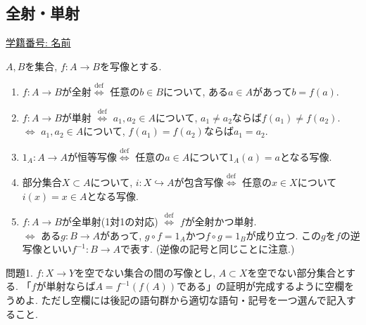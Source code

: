 \documentclass[dvipdfmx,a4paper,11pt]{article}
\theoremstyle{definition}
\begin{document}

 \newpage
 \begin{center}
\section{全射・単射}
\label{sec-4}
\end{center}
 \begin{flushleft}
{ \large \underline{学籍番号: \hspace{4cm} 名前  \hspace{8.5cm}}}
{\footnotesize }
\end{flushleft}


\begin{tcolorbox}[
    colback = white,
    colframe = black!35!black,
    fonttitle = \bfseries,
    breakable = true]
    $A,B$を集合, $f :A \to B$を写像とする. 
    \begin{enumerate}
    \setlength{\parskip}{0cm} 
  \setlength{\itemsep}{0cm} 
    \item $f :A \to B$が全射$\stackrel{\mathrm{def}}{\Longleftrightarrow}$ 任意の$b \in B$について, ある$a \in A$があって$b = f(a)$.
    \item $f :A \to B$が単射 $\stackrel{\mathrm{def}}{\Longleftrightarrow}$ $a_1, a_2 \in A$について, $a_1 \neq a_2$ならば$f(a_1) \neq f(a_2)$.
    \\ $\stackrel{}{\Longleftrightarrow}$ $a_1, a_2 \in A$について, $f(a_1)=f(a_2)$ならば$a_1 = a_2$.
    \item $1_{A}: A \to A$が恒等写像$\stackrel{\mathrm{def}}{\Longleftrightarrow}$ 任意の$a \in A$について$1_A(a)=a$となる写像. 
    \item 部分集合$X \subset A$について, $i : X\hookrightarrow A$が包含写像$\stackrel{\mathrm{def}}{\Longleftrightarrow}$ 任意の$x \in X$について$i(x)=x \in A$となる写像. 
    \item $f :A \to B$が全単射(1対1の対応) $\stackrel{\mathrm{def}}{\Longleftrightarrow}$ $f$が全射かつ単射.
    \\ $\stackrel{}{\Longleftrightarrow}$ ある$g : B\to A$があって, $g \circ f = 1_A$かつ$f \circ g = 1_B$が成り立つ. この$g$を$f$の逆写像といい$f^{-1} : B \to A$で表す. (逆像の記号と同じことに注意.)
    \end{enumerate}
 \end{tcolorbox}
 
 \medskip
 問題1. $f : X \to Y$を空でない集合の間の写像とし, $A \subset X$を空でない部分集合とする.
 「$f$が単射ならば$A=f^{-1}(f(A))$である」の証明が完成するように空欄をうめよ. 
ただし空欄には後記の語句群から適切な語句・記号を一つ選んで記入すること.
\end{document}
